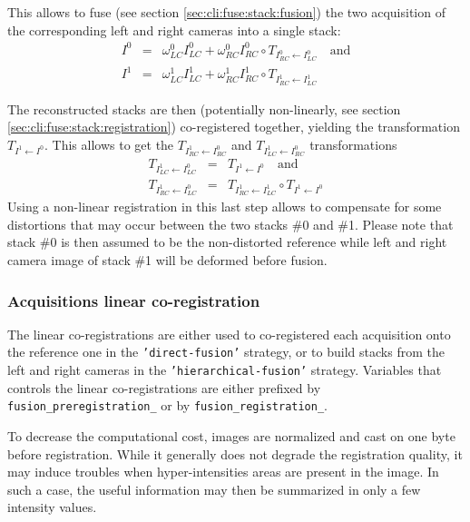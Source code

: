 This allows to fuse (see section \ref{sec:cli:fuse:stack:fusion}) the two acquisition of the corresponding left and right cameras into a single stack:
\begin{eqnarray*}
I^{0} & = & \omega^{0}_{LC} I^{0}_{LC} 
          + \omega^{0}_{RC} I^{0}_{RC} \circ T_{I^{0}_{RC} \leftarrow I^{0}_{LC}} \quad \textrm{and} \\
I^{1} & = & \omega^{1}_{LC} I^{1}_{LC} 
          + \omega^{1}_{RC} I^{1}_{RC} \circ T_{I^{1}_{RC} \leftarrow I^{1}_{LC}}                         
\end{eqnarray*}

The reconstructed stacks are then (potentially non-linearly, see section \ref{sec:cli:fuse:stack:registration}) co-registered together, yielding the transformation $T_{I^{1} \leftarrow I^{0}}$. This allows to get the 
$T_{I^{1}_{RC} \leftarrow I^{0}_{RC}}$ and
$T_{I^{1}_{LC} \leftarrow I^{0}_{RC}}$ transformations 
\begin{eqnarray*}
T_{I^{1}_{LC} \leftarrow I^{0}_{LC}} & = & T_{I^{1} \leftarrow I^{0}} \quad \textrm{and} \\
T_{I^{1}_{RC} \leftarrow I^{0}_{LC}} & = &
T_{I^{1}_{RC} \leftarrow I^{1}_{LC}} \circ T_{I^{1} \leftarrow I^{0}}                      
\end{eqnarray*}
Using a non-linear registration in this last step allows to compensate for some distortions that may occur between the two stacks \#0 and \#1. Please note that stack \#0 is then assumed to be the non-distorted reference while left and right camera image of stack \#1 will be deformed before fusion.


\subsubsection{Acquisitions linear co-registration}
\label{sec:cli:fuse:acquisition:registration}
The linear co-registrations are either used to co-registered each acquisition onto the reference one in the \texttt{'direct-fusion'} strategy, or to build stacks from the left and right cameras in the \texttt{'hierarchical-fusion'} strategy.
Variables that controls the linear co-registrations are either prefixed by \texttt{fusion\_preregistration\_} or by \texttt{fusion\_registration\_}.

To decrease the computational cost, images are normalized and cast on one byte before registration. While it generally does not degrade the registration quality, it may induce troubles when hyper-intensities areas are present in the image. In such a case, the useful information may then be summarized in only a few intensity values.

